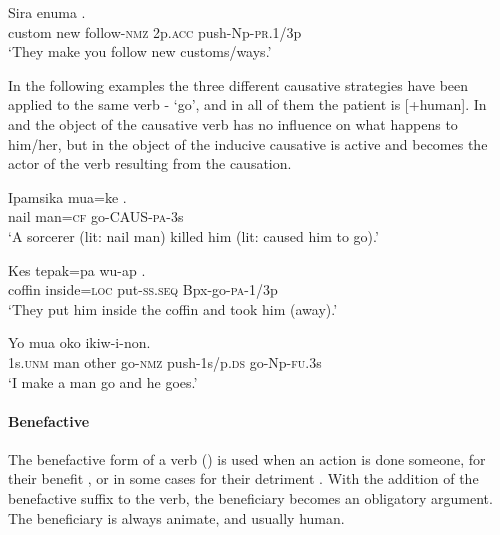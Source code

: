 \ea%
\label{ex:3:x1002}
\gll Sira enuma   . \\
custom new follow-\textsc{nmz} 2p.\textsc{acc} push-Np-\textsc{pr}.1/3p\\
\glt`They make you follow new customs/ways.'
\z

In the following examples the three different causative strategies have been applied to the same verb - `go', and in all of them the patient is [+human]. In  and  the object of the causative verb has no influence on what happens to him/her, but in  the object of the inducive causative is active and becomes the actor of the verb resulting from the causation. 

\ea%
\label{ex:3:x1016}
\gll Ipamsika mua=ke . \\
nail man=\textsc{cf} go-CAUS-\textsc{pa}-3s \\
\glt`A sorcerer (lit: nail man) killed him (lit: caused him to go).'
\z

\ea%
\label{ex:3:x1829}
\gll Kes tepak=pa wu-ap . \\
coffin inside=\textsc{loc} put-\textsc{ss}.\textsc{seq} Bpx-go-\textsc{pa}-1/3p\\
\glt`They put him inside the coffin and took him (away).'
\z

\ea%
\label{ex:3:x1873}
\gll Yo mua oko   ikiw-i-non. \\
1s.\textsc{unm} man other go-\textsc{nmz} push-1s/p.\textsc{ds} go-Np-\textsc{fu}.3s\\
\glt`I make a man go and he goes.'
\z

\paragraph{ Benefactive}\label{sec:3:a:z:y:x}
{}
The benefactive form of a verb () is used when an action is done someone, for their benefit , or in some cases for their detriment . With the addition of the benefactive suffix to the verb, the beneficiary becomes an obligatory argument. The beneficiary is always animate, and usually human. 

